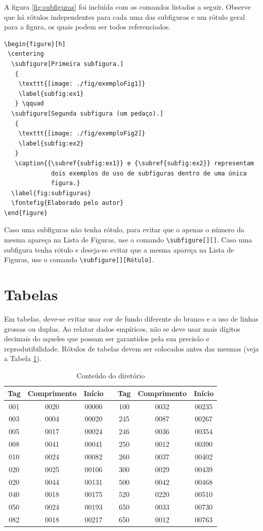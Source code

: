 A figura \ref{fig:subfiguras} foi incluída com os comandos listados a seguir. Observe que há rótulos independentes para cada uma das subfiguras e um rótulo geral para a figura, os quais podem ser todos referenciados.
\begin{Verbatim}
\begin{figure}[h]
 \centering
  \subfigure[Primeira subfigura.]
   {
    \texttt{[image: ./fig/exemploFig1]}
    \label{subfig:ex1}
   } \qquad
  \subfigure[Segunda subfigura (um pedaço).]
   {
    \texttt{[image: ./fig/exemploFig2]}
    \label{subfig:ex2}
   }
   \caption{{\subref{subfig:ex1}} e {\subref{subfig:ex2}} representam
             dois exemplos do uso de subfiguras dentro de uma única
             figura.}
  \label{fig:subfiguras}
  \fontefig{Elaborado pelo autor}
\end{figure}
\end{Verbatim}
 Caso uma subfiguras não tenha rótulo, para evitar que o apenas o número da mesma apareça na Lista de Figuras, use o comando \verb|\subfigure[][]|.  Caso uma subfigura tenha rótulo e deseja-se evitar que a mesma apareça na Lista de Figuras, use o comando \verb|\subfigure[][Rótulo]|.
 
\section{Tabelas}
\label{sec:tabs} 
Em tabelas, deve-se evitar usar cor de fundo diferente do branco e o uso de linhas grossas ou duplas. Ao relatar dados empíricos, não se deve usar mais dígitos decimais do aqueles que possam ser garantidos pela sua precisão e reprodutibilidade. Rótulos de tabelas devem ser colocados
antes das mesmas (veja a Tabela \ref{tab:MarcMNem}).

\begin{table}[!ht]
\centering
\caption{Conteúdo do diretório}
\label{tab:MarcMNem} 
\begin{tabular}{c|c|c|c|c|c|c}
\hline Tag & Comprimento & Início &   & Tag & Comprimento & Início \\ 
\hline 001 & 0020 & 00000 && 100 & 0032 & 00235\\ 
\hline 003 & 0004 & 00020 && 245 & 0087 & 00267\\ 
\hline 005 & 0017 & 00024 && 246 & 0036 & 00354\\ 
\hline 008 & 0041 & 00041 && 250 & 0012 & 00390\\ 
\hline 010 & 0024 & 00082 && 260 & 0037 & 00402\\ 
\hline 020 & 0025 & 00106 && 300 & 0029 & 00439\\ 
\hline 020 & 0044 & 00131 && 500 & 0042 & 00468\\ 
\hline 040 & 0018 & 00175 && 520 & 0220 & 00510\\ 
\hline 050 & 0024 & 00193 && 650 & 0033 & 00730\\ 
\hline 082 & 0018 & 00217 && 650 & 0012 & 00763\\ 
\hline 
\end{tabular} 
\end{table}

